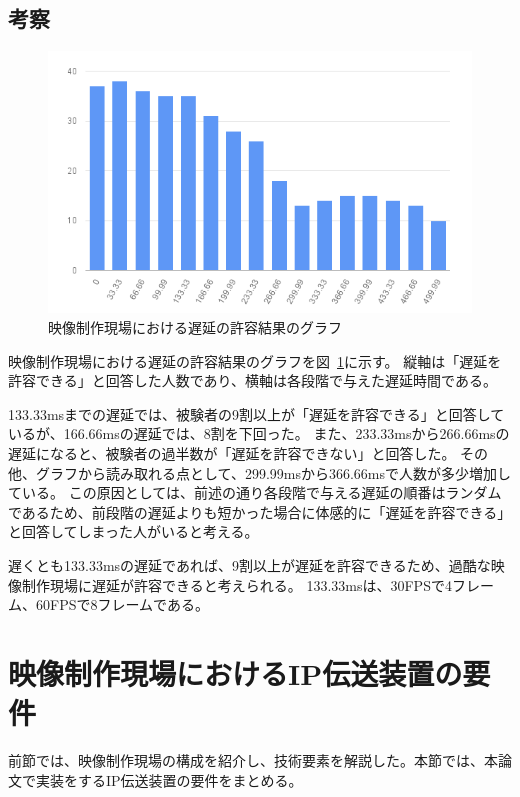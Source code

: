 \subsection{考察}

\begin{figure}[htbp]
  \begin{center}
    \includegraphics[bb=0 0 600 371,width=13cm]{img/mv-delay-result-graph.png}
  \end{center}
  \caption{映像制作現場における遅延の許容結果のグラフ}
  \label{fig:mv-delay-result-graph}
\end{figure}

映像制作現場における遅延の許容結果のグラフを図~\ref{fig:mv-delay-result-graph}に示す。
縦軸は「遅延を許容できる」と回答した人数であり、横軸は各段階で与えた遅延時間である。

133.33msまでの遅延では、被験者の9割以上が「遅延を許容できる」と回答しているが、166.66msの遅延では、8割を下回った。
また、233.33msから266.66msの遅延になると、被験者の過半数が「遅延を許容できない」と回答した。
その他、グラフから読み取れる点として、299.99msから366.66msで人数が多少増加している。
この原因としては、前述の通り各段階で与える遅延の順番はランダムであるため、前段階の遅延よりも短かった場合に体感的に「遅延を許容できる」と回答してしまった人がいると考える。

遅くとも133.33msの遅延であれば、9割以上が遅延を許容できるため、過酷な映像制作現場に遅延が許容できると考えられる。
133.33msは、30FPSで4フレーム、60FPSで8フレームである。

\section{映像制作現場におけるIP伝送装置の要件}
前節では、映像制作現場の構成を紹介し、技術要素を解説した。本節では、本論文で実装をするIP伝送装置の要件をまとめる。

